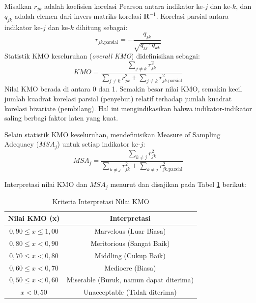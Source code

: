 \begin{definition}
  Misalkan $r_{jk}$ adalah koefisien korelasi Pearson antara indikator ke-$j$ dan ke-$k$, dan $q_{jk}$ adalah elemen dari invers matriks korelasi $\mathbf{R}^{-1}$. Korelasi parsial antara indikator ke-$j$ dan ke-$k$ dihitung sebagai:
  \begin{equation}
    r_{jk.\text{parsial}} = -\frac{q_{jk}}{\sqrt{q_{jj} \cdot q_{kk}}}
  \end{equation}
  Statistik KMO keseluruhan (\textit{overall KMO}) didefinisikan sebagai:
  \begin{equation} \label{eq:kmo}
    KMO = \frac{\displaystyle\sum_{j \neq k} r_{jk}^2}{\displaystyle\sum_{j \neq k} r_{jk}^2 + \displaystyle\sum_{j \neq k} r_{jk.\text{parsial}}^2}
  \end{equation}
  Nilai KMO berada di antara 0 dan 1. Semakin besar nilai KMO, semakin kecil jumlah kuadrat korelasi parsial (penyebut) relatif terhadap jumlah kuadrat korelasi bivariate (pembilang). Hal ini mengindikasikan bahwa indikator-indikator saling berbagi faktor laten yang kuat.
\end{definition}

Selain statistik KMO keseluruhan, \citet{kaiser1974} mendefinisikan Measure of Sampling Adequacy ($MSA_j$) untuk setiap indikator ke-$j$:
\begin{equation}
  MSA_j = \frac{\displaystyle\sum_{k \neq j} r_{jk}^2}{\displaystyle\sum_{k \neq j} r_{jk}^2 + \displaystyle\sum_{k \neq j} r_{jk.\text{parsial}}^2}
\end{equation}

Interpretasi nilai KMO dan $MSA_j$ menurut \citet{kaiser1974} dan \citet{hair2019} disajikan pada Tabel \ref{tab:kmo-interpretation} berikut:

\begin{table}[H]
\centering
\caption{Kriteria Interpretasi Nilai KMO}\label{tab:kmo-interpretation}
\begin{tabular}{|c|c|}
\hline
\textbf{Nilai KMO (x)} & \textbf{Interpretasi} \\
\hline
$0{,}90 \leq x \leq 1{,}00$ & Marvelous (Luar Biasa) \\
$0{,}80 \leq x < 0{,}90$ & Meritorious (Sangat Baik) \\
$0{,}70 \leq x < 0{,}80$ & Middling (Cukup Baik) \\
$0{,}60 \leq x < 0{,}70$ & Mediocre (Biasa) \\
$0{,}50 \leq x < 0{,}60$ & Miserable (Buruk, namun dapat diterima) \\
$x < 0{,}50$ & Unacceptable (Tidak diterima) \\
\hline
\end{tabular}
\end{table}

